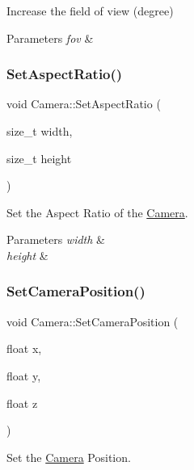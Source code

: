 Increase the field of view (degree) 


\begin{DoxyParams}{Parameters}
{\em fov} & \\
\hline
\end{DoxyParams}
\mbox{\label{classCamera_a8144951dd9ddd5557176e677fdfac282}} 
\subsubsection{\texorpdfstring{Set\+Aspect\+Ratio()}{SetAspectRatio()}}
{\footnotesize\ttfamily void Camera\+::\+Set\+Aspect\+Ratio (\begin{DoxyParamCaption}\item[{size\+\_\+t}]{width,  }\item[{size\+\_\+t}]{height }\end{DoxyParamCaption})}



Set the Aspect Ratio of the \hyperlink{classCamera}{Camera}. 


\begin{DoxyParams}{Parameters}
{\em width} & \\
\hline
{\em height} & \\
\hline
\end{DoxyParams}
\mbox{\label{classCamera_a83ffec8a5dfac0fa1ca1ea6388035dca}} 
\subsubsection{\texorpdfstring{Set\+Camera\+Position()}{SetCameraPosition()}\hspace{0.1cm}{\footnotesize\ttfamily [1/2]}}
{\footnotesize\ttfamily void Camera\+::\+Set\+Camera\+Position (\begin{DoxyParamCaption}\item[{float}]{x,  }\item[{float}]{y,  }\item[{float}]{z }\end{DoxyParamCaption})}



Set the \hyperlink{classCamera}{Camera} Position. 


